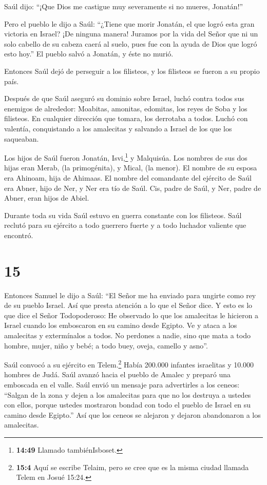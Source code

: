  Saúl dijo: ``¡Que Dios me castigue muy severamente si no
mueres, Jonatán!''

 Pero el pueblo le dijo a Saúl: ``¿Tiene que morir Jonatán,
el que logró esta gran victoria en Israel? ¡De ninguna manera! Juramos
por la vida del Señor que ni un solo cabello de su cabeza caerá al
suelo, pues fue con la ayuda de Dios que logró esto hoy.'' El pueblo
salvó a Jonatán, y éste no murió.

 Entonces Saúl dejó de perseguir a los filisteos, y los
filisteos se fueron a su propio país.

 Después de que Saúl aseguró su dominio sobre Israel, luchó
contra todos sus enemigos de alrededor: Moabitas, amonitas, edomitas,
los reyes de Soba y los filisteos. En cualquier dirección que tomara,
los derrotaba a todos.  Luchó con valentía, conquistando a
los amalecitas y salvando a Israel de los que los saqueaban.

 Los hijos de Saúl fueron Jonatán, Isvi,\footnote{\textbf{14:49}
  Llamado tambiénIsboset.} y Malquisúa. Los nombres de sus dos hijas
eran Merab, (la primogénita), y Mical, (la menor).  El
nombre de su esposa era Ahinoam, hija de Ahimaas. El nombre del
comandante del ejército de Saúl era Abner, hijo de Ner, y Ner era tío de
Saúl.  Cis, padre de Saúl, y Ner, padre de Abner, eran
hijos de Abiel.

 Durante toda su vida Saúl estuvo en guerra constante con
los filisteos. Saúl reclutó para su ejército a todo guerrero fuerte y a
todo luchador valiente que encontró.

\hypertarget{section-14}{%
\section{15}\label{section-14}}

 Entonces Samuel le dijo a Saúl: ``El Señor me ha enviado
para ungirte como rey de su pueblo Israel. Así que presta atención a lo
que el Señor dice.  Y esto es lo que dice el Señor
Todopoderoso: He observado lo que los amalecitas le hicieron a Israel
cuando los emboscaron en su camino desde Egipto.  Ve y ataca
a los amalecitas y extermínalos a todos. No perdones a nadie, sino que
mata a todo hombre, mujer, niño y bebé; a todo buey, oveja, camello y
asno''.

 Saúl convocó a su ejército en Telem.\footnote{\textbf{15:4}
  Aquí se escribe Telaim, pero se cree que es la misma ciudad llamada
  Telem en Josué 15:24.} Había 200.000 infantes israelitas y 10.000
hombres de Judá.  Saúl avanzó hacia el pueblo de Amalec y
preparó una emboscada en el valle.  Saúl envió un mensaje
para advertirles a los ceneos: ``Salgan de la zona y dejen a los
amalecitas para que no los destruya a ustedes con ellos, porque ustedes
mostraron bondad con todo el pueblo de Israel en su camino desde
Egipto.'' Así que los ceneos se alejaron y dejaron abandonaron a los
amalecitas.

